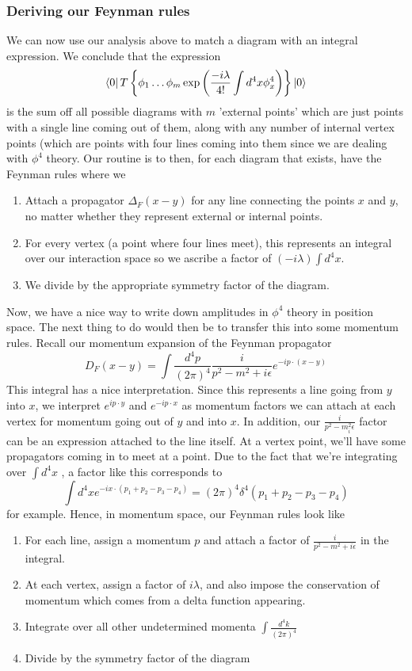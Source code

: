 \subsubsection{Deriving our Feynman rules} 
We can now use our analysis above to 
match a diagram with an integral expression. 
We conclude that the expression 
\[
 \bra{ 0 } T \left\{  \phi _ 1 \dots \phi _ m 
 \exp \left(  \frac{ - i \lambda }{ 4 ! } \int d ^ 4 x \phi ^ 4 _ x  \right) \right\} \ket{ 0 }  
\]  is the sum off all possible diagrams with $ m $ 'external points' 
which are just points with a single line coming out of them, along 
with any number of internal vertex points (which are points with 
four lines coming into them since we are dealing with $ \phi ^ 4 $ theory. 
Our routine is to then, for each diagram that exists, have the Feynman rules where we 
\begin{enumerate}
	\item Attach a propagator $ \Delta _ F ( x -y ) $ for any 
		line connecting the points $ x $ and $ y $, no matter 
		whether they represent external or internal points. 
	\item For every vertex (a point where four lines meet), this 
		represents an integral over our interaction space 
		so we ascribe a factor of $ ( - i \lambda ) \int d ^ 4 x $. 
	\item We divide by the appropriate symmetry factor of the diagram. 
\end{enumerate}
Now, we have a nice way to write down amplitudes in $ \phi ^ 4 $ theory 
in position space. The next thing to do would then 
be to transfer this into some momentum rules. Recall our momentum 
expansion of the Feynman propagator 
\[
	D _ F ( x - y ) = \int \frac{ d ^  4 p }{ ( 2 \pi ) ^ 4 } \frac{i }{ p ^ 2 
	- m ^ 2  + i \epsilon } e ^{ - i p \cdot  ( x - y ) }
\] This integral has a nice interpretation. Since this represents a line going 
from $ y $ into $ x $, we interpret $ e ^{ i  p \cdot  y } $ and 
$ e ^{  - i p \cdot  x }$ as momentum factors we can attach at 
each vertex for momentum going out of $ y $ and into $ x $. In addition, 
our  $ \frac{i}{ p ^ 2 - m ^ 2 _ i \epsilon } $ factor can be 
an expression attached to the line itself. 
At a vertex point, we'll have some propagators coming in 
to meet at a point. Due to the fact that we're integrating 
over $ \int d ^ 4 x $ , a factor like this corresponds to 
\[
	\int d ^ 4 x e ^{  -i x \cdot  ( p_1 + p_2 - p_3 - p_4 ) } = 
	( 2 \pi ) ^ 4 \delta ^ 4 ( p_1 + p_2 - p_3 - p_4 ) 
\] for example. Hence, in momentum space, 
our Feynman rules look like 
\begin{enumerate}
	\item For each line, assign a momentum $ p $ and attach 
		a factor of $ \frac{i}{p ^ 2 - m ^ 2 + i \epsilon } $
		in the integral. 
	\item At each vertex, assign a factor of $ i \lambda $, 
		and also impose the conservation of momentum which 
		comes from a delta function appearing. 
	\item Integrate over all other undetermined momenta 
		$ \int \frac{ d ^ 4 k}{  ( 2 \pi ) ^  4}$ 
	\item Divide by the symmetry factor of the diagram 
\end{enumerate}

